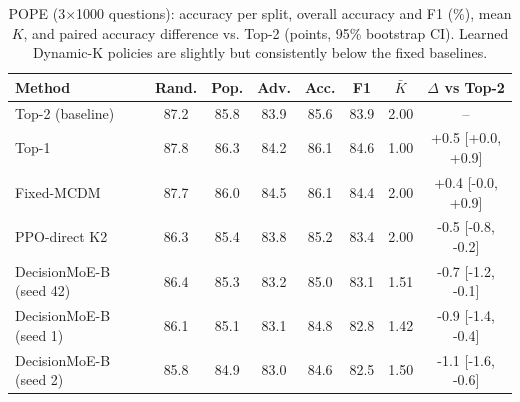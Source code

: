 \begin{table}[t]
\centering
\small
\begin{tabular}{lccccccc}
\toprule
Method & Rand. & Pop. & Adv. & Acc. & F1 & $\bar K$ & $\Delta$ vs Top-2 \\
\midrule
Top-2 (baseline) & 87.2 & 85.8 & 83.9 & 85.6 & 83.9 & 2.00 & -- \\
Top-1 & 87.8 & 86.3 & 84.2 & 86.1 & 84.6 & 1.00 & +0.5 [+0.0, +0.9] \\
Fixed-MCDM & 87.7 & 86.0 & 84.5 & 86.1 & 84.4 & 2.00 & +0.4 [-0.0, +0.9] \\
PPO-direct K2 & 86.3 & 85.4 & 83.8 & 85.2 & 83.4 & 2.00 & -0.5 [-0.8, -0.2] \\
DecisionMoE-B (seed 42) & 86.4 & 85.3 & 83.2 & 85.0 & 83.1 & 1.51 & -0.7 [-1.2, -0.1] \\
DecisionMoE-B (seed 1) & 86.1 & 85.1 & 83.1 & 84.8 & 82.8 & 1.42 & -0.9 [-1.4, -0.4] \\
DecisionMoE-B (seed 2) & 85.8 & 84.9 & 83.0 & 84.6 & 82.5 & 1.50 & -1.1 [-1.6, -0.6] \\
\bottomrule
\end{tabular}
\caption{POPE (3$\times$1000 questions): accuracy per split, overall accuracy and F1 (\%), mean $K$, and paired accuracy difference vs. Top-2 (points, 95\% bootstrap CI). Learned Dynamic-K policies are slightly but consistently below the fixed baselines.}
\label{tab:pope}
\end{table}
